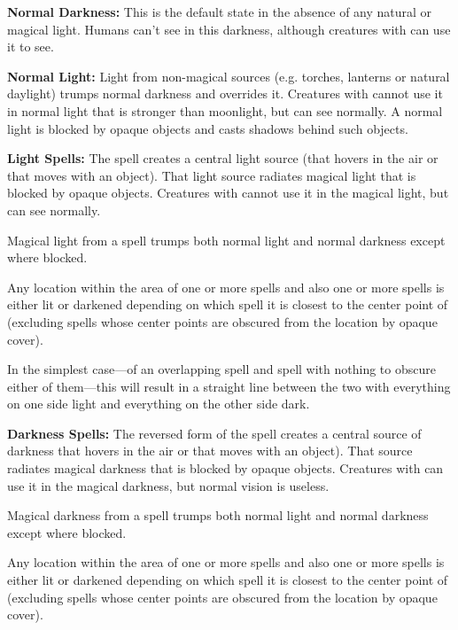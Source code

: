\begin{multicols*}{2}
\textbf{Normal Darkness:} This is the default state in the absence of any natural or magical light. Humans can’t see in this darkness, although creatures with  can use it to see.

\textbf{Normal Light:} Light from non-magical sources (e.g. torches, lanterns or natural daylight) trumps normal darkness and overrides it. Creatures with  cannot use it in normal light that is stronger than moonlight, but can see normally. A normal light is blocked by opaque objects and casts shadows behind such objects.

\textbf{Light Spells:} The  spell creates a central light source (that hovers in the air or that moves with an object). That light source radiates magical light that is blocked by opaque objects. Creatures with  cannot use it in the magical light, but can see normally.

Magical light from a  spell trumps both normal light and normal darkness except where blocked.

Any location within the area of one or more  spells and also one or more  spells is either lit or darkened depending on which spell it is closest to the center point of (excluding spells whose center points are obscured from the location by opaque cover).

In the simplest case—of an overlapping  spell and  spell with nothing to obscure either of them—this will result in a straight line between the two with everything on one side light and everything on the other side dark.

\textbf{Darkness Spells:} The reversed form of the  spell creates a central source of darkness that hovers in the air or that moves with an object). That source radiates magical darkness that is blocked by opaque objects. Creatures with  can use it in the magical darkness, but normal vision is useless.

Magical darkness from a  spell trumps both normal light and normal darkness except where blocked.

Any location within the area of one or more  spells and also one or more  spells is either lit or darkened depending on which spell it is closest to the center point of (excluding spells whose center points are obscured from the location by opaque cover).


\end{multicols*}
